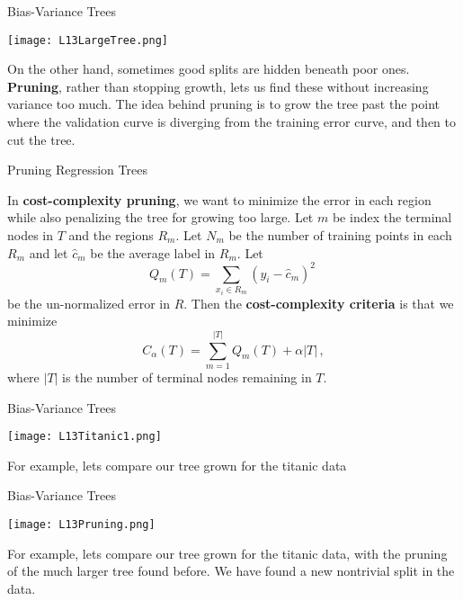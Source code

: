 \documentclass[10pt, table, dvipsnames,xcdraw]{beamer}
\begin{document}
\begin{frame}[fragile]{Bias-Variance Trees}
  \begin{minipage}[t][0.5\textheight][t]{\textwidth}
	\centering \texttt{[image: L13LargeTree.png]} 
  \end{minipage}
  \vfill
\begin{minipage}[t][0.5\textheight][t]{\textwidth}
On the other hand, sometimes good splits are hidden beneath poor ones. \textbf{Pruning}, rather than stopping growth, lets us find these without increasing variance too much. The idea behind pruning is to grow the tree past the point where the validation curve is diverging from the training error curve, and then to cut the tree.
\end{minipage}
\end{frame}





\begin{frame}[fragile]{Pruning Regression Trees}

In \textbf{cost-complexity pruning}, we want to minimize the error in each region while also penalizing the tree for growing too large. Let $m$ be index the terminal nodes in $T$ and the regions $R_m$. Let $N_m$ be the number of training points in each $R_m$ and let $\hat{c}_m$ be the average label in $R_m$. \pause Let
\[
Q_m(T) = \sum_{x_i\in R_m}(y_i-\hat{c}_m)^2\
\] 
be the un-normalized error in $R$. \pause Then the \textbf{cost-complexity criteria} is that we minimize
$$
C_\alpha(T) = \sum_{m=1}^{|T|} Q_m(T) + \alpha|T|\,,
$$
where $|T|$ is the number of terminal nodes remaining in $T$. \pause
\end{frame}





\begin{frame}[fragile]{Bias-Variance Trees}
  \begin{minipage}[t][0.5\textheight][t]{\textwidth}
	\centering \texttt{[image: L13Titanic1.png]} 
  \end{minipage}
  \vfill
\begin{minipage}[t][0.5\textheight][t]{\textwidth}
For example, lets compare our tree grown for the titanic data
\end{minipage}
\end{frame}



\begin{frame}[fragile]{Bias-Variance Trees}
  \begin{minipage}[t][0.5\textheight][t]{\textwidth}
	\centering \texttt{[image: L13Pruning.png]} 
  \end{minipage}
  \vfill
\begin{minipage}[t][0.5\textheight][t]{\textwidth}
For example, lets compare our tree grown for the titanic data, with the pruning of the much larger tree found before. We have found a new nontrivial split in the data. 
\end{minipage}
\end{frame}
\end{document}
